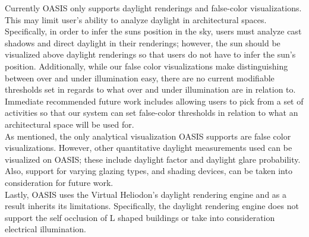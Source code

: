 
Currently OASIS only supports daylight renderings and false-color visualizations. This may limit user's ability to analyze daylight in architectural spaces. Specifically, in order to infer the suns position in the sky, users must analyze cast shadows and  direct daylight in their renderings; however, the sun should be visualized above daylight renderings so that users do not have to infer the sun's position. Additionally, while our false color visualizations make distinguishing between over and under illumination easy, there are no current modifiable thresholds set in regards to what over and under illumination are in relation to. Immediate recommended future work includes allowing users to pick from a set of activities so that our system can set false-color thresholds in relation to what an architectural space will be used for.  \\ 


As mentioned, the only analytical visualization OASIS supports are false color visualizations. However, other quantitative daylight measurements used can be visualized on OASIS; these include daylight factor and daylight glare probability. Also, support for varying glazing types, and shading devices, can be taken into consideration for future work.  \\ 


Lastly, OASIS uses the Virtual Heliodon's daylight rendering engine and as a result inherits its limitations. Specifically, the daylight rendering engine does not support the self occlusion of L shaped buildings or take into consideration electrical illumination.  \\



